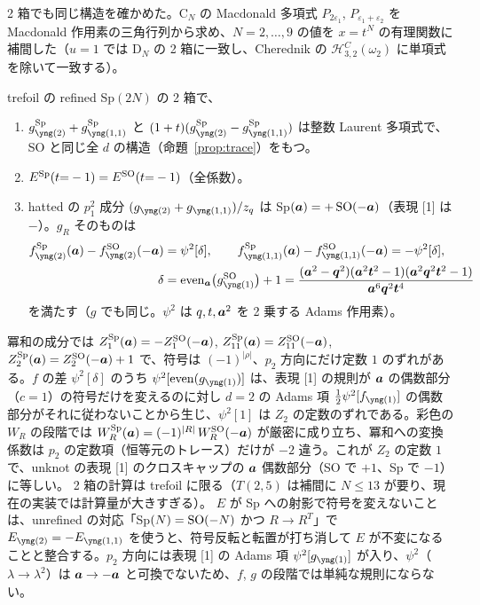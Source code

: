2 箱でも同じ構造を確かめた。C$_N$ の Macdonald 多項式 $P_{2\varepsilon_1}$, $P_{\varepsilon_1+\varepsilon_2}$ を Macdonald 作用素の三角行列から求め、$N = 2, \dots, 9$ の値を $x = t^N$ の有理関数に補間した（$u = 1$ では D$_N$ の 2 箱に一致し、Cherednik の $\mathcal{H}^C_{3,2}(\omega_2)$ に単項式を除いて一致する）。
\begin{compresult}
trefoil の refined Sp$(2N)$ の 2 箱で、
\begin{enumerate}
\item $g^{\mathrm{Sp}}_{\ytwo} + g^{\mathrm{Sp}}_{\yoneone}$ と $(1+t)(g^{\mathrm{Sp}}_{\ytwo} - g^{\mathrm{Sp}}_{\yoneone})$ は整数 Laurent 多項式で、SO と同じ全 $d$ の構造（命題~\ref{prop:trace}）をもつ。
\item $E^{\mathrm{Sp}}(t{=}-1) = E^{\mathrm{SO}}(t{=}-1)$（全係数）。
\item hatted の $p_1^2$ 成分 $(g_{\ytwo} + g_{\yoneone})/z_q$ は Sp$(\bm{a}) = +\,\mathrm{SO}(-\bm{a})$（表現 [1] は $-$）。$g_R$ そのものは
\begin{align*}
f^{\mathrm{Sp}}_{\ytwo}(\ba) - f^{\SO}_{\ytwo}(-\ba) &= \psi^2[\delta], \qquad f^{\mathrm{Sp}}_{\yoneone}(\ba) - f^{\SO}_{\yoneone}(-\ba) = -\psi^2[\delta], \\
\delta &= \mathrm{even}_{\ba}\big(g^{\SO}_{\yone}\big) + 1 = \frac{(\ba^2 - \bq^2)(\ba^2\bt^2 - 1)(\ba^2\bq^2\bt^2 - 1)}{\ba^6\bq^2\bt^4}
\end{align*}
を満たす（$g$ でも同じ。$\psi^2$ は $q, t, \bm{a}^2$ を 2 乗する Adams 作用素）。
\end{enumerate}
\end{compresult}
冪和の成分では $Z_1^{\mathrm{Sp}}(\bm{a}) = -Z_1^{\mathrm{SO}}(-\bm{a})$, $Z_{11}^{\mathrm{Sp}}(\bm{a}) = Z_{11}^{\mathrm{SO}}(-\bm{a})$, $Z_2^{\mathrm{Sp}}(\bm{a}) = Z_2^{\mathrm{SO}}(-\bm{a}) + 1$ で、符号は $(-1)^{|\rho|}$、$p_2$ 方向にだけ定数 $1$ のずれがある。$f$ の差 $\psi^2[\delta]$ のうち $\psi^2[\mathrm{even}(g_{\yone})]$ は、表現 [1] の規則が $\bm{a}$ の偶数部分（$c = 1$）の符号だけを変えるのに対し $d = 2$ の Adams 項 $\tfrac12\psi^2[f_{\yone}]$ の偶数部分がそれに従わないことから生じ、$\psi^2[1]$ は $Z_2$ の定数のずれである。彩色の $W_R$ の段階では $W_R^{\mathrm{Sp}}(\bm{a}) = (-1)^{|R|}\,W_R^{\mathrm{SO}}(-\bm{a})$ が厳密に成り立ち、冪和への変換係数は $p_2$ の定数項（恒等元のトレース）だけが $-2$ 違う。これが $Z_2$ の定数 $1$ で、unknot の表現 [1] のクロスキャップの $\bm{a}$ 偶数部分（SO で $+1$、Sp で $-1$）に等しい。
2 箱の計算は trefoil に限る（$T(2,5)$ は補間に $N \le 13$ が要り、現在の実装では計算量が大きすぎる）。
$E$ が Sp への射影で符号を変えないことは、unrefined の対応「Sp$(N) = \mathrm{SO}(-N)$ かつ $R \to R^{T}$」で $E_{\ytwo} = -E_{\yoneone}$ を使うと、符号反転と転置が打ち消して $E$ が不変になることと整合する。$p_2$ 方向には表現 [1] の Adams 項 $\psi^2[g_{\yone}]$ が入り、$\psi^2$（$\lambda \to \lambda^2$）は $\bm{a} \to -\bm{a}$ と可換でないため、$f$, $g$ の段階では単純な規則にならない。

